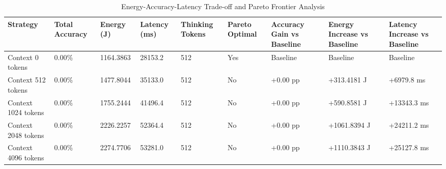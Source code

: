 \begin{table}
\caption{Energy-Accuracy-Latency Trade-off and Pareto Frontier Analysis}
\label{tab:tradeoff_comparison}
\begin{tabular}{lllllllll}
\toprule
Strategy & Total Accuracy & Energy (J) & Latency (ms) & Thinking Tokens & Pareto Optimal & Accuracy Gain vs Baseline & Energy Increase vs Baseline & Latency Increase vs Baseline \\
\midrule
Context 0 tokens & 0.00\% & 1164.3863 & 28153.2 & 512 & Yes & Baseline & Baseline & Baseline \\
Context 512 tokens & 0.00\% & 1477.8044 & 35133.0 & 512 & No & +0.00 pp & +313.4181 J & +6979.8 ms \\
Context 1024 tokens & 0.00\% & 1755.2444 & 41496.4 & 512 & No & +0.00 pp & +590.8581 J & +13343.3 ms \\
Context 2048 tokens & 0.00\% & 2226.2257 & 52364.4 & 512 & No & +0.00 pp & +1061.8394 J & +24211.2 ms \\
Context 4096 tokens & 0.00\% & 2274.7706 & 53281.0 & 512 & No & +0.00 pp & +1110.3843 J & +25127.8 ms \\
\bottomrule
\end{tabular}
\end{table}
